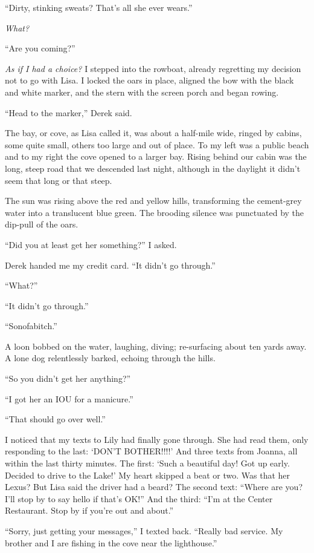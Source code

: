 ``Dirty, stinking sweats? That's all she ever wears.''

\emph{What?}

``Are you coming?''

\emph{As if I had a choice?} I stepped into the rowboat, already
regretting my decision not to go with Lisa. I locked the oars in place,
aligned the bow with the black and white marker, and the stern with the
screen porch and began rowing.

``Head to the marker,'' Derek said.

The bay, or cove, as Lisa called it, was about a half-mile wide, ringed
by cabins, some quite small, others too large and out of place. To my
left was a public beach and to my right the cove opened to a larger bay.
Rising behind our cabin was the long, steep road that we descended last
night, although in the daylight it didn't seem that long or that steep.

The sun was rising above the red and yellow hills, transforming the
cement-grey water into a translucent blue green. The brooding silence
was punctuated by the dip-pull of the oars.

``Did you at least get her something?'' I asked.

Derek handed me my credit card. ``It didn't go through.''

``What?''

``It didn't go through.''

``Sonofabitch.''

A loon bobbed on the water, laughing, diving; re-surfacing about ten
yards away. A lone dog relentlessly barked, echoing through the hills.

``So you didn't get her anything?''

``I got her an IOU for a manicure.''

``That should go over well.''

I noticed that my texts to Lily had finally gone through. She had read
them, only responding to the last: `DON'T BOTHER!!!!' And three texts
from Joanna, all within the last thirty minutes. The first: `Such a
beautiful day! Got up early. Decided to drive to the Lake!' My heart
skipped a beat or two. Was that her Lexus? But Lisa said the driver had
a beard? The second text: ``Where are you? I'll stop by to say hello if
that's OK!'' And the third: ``I'm at the Center Restaurant. Stop by if
you're out and about.''

``Sorry, just getting your messages,'' I texted back. ``Really bad
service. My brother and I are fishing in the cove near the lighthouse.''

